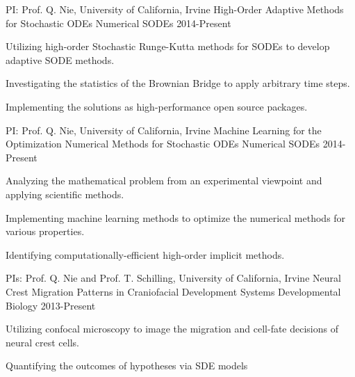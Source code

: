 

\begin{cventries}

\cventry
{PI: Prof. Q. Nie, University of California, Irvine} %
{High-Order Adaptive Methods for Stochastic ODEs} %
{Numerical SODEs} %
{2014-Present} %
{
	\begin{cvitems} %
		\item {Utilizing high-order Stochastic Runge-Kutta methods for SODEs to develop adaptive SODE methods.}
		\item {Investigating the statistics of the Brownian Bridge to apply arbitrary time steps.}
		\item {Implementing the solutions as high-performance open source packages.}
	\end{cvitems}
}
	
\cventry
{PI: Prof. Q. Nie, University of California, Irvine} %
{Machine Learning for the Optimization Numerical Methods for Stochastic ODEs} %
{Numerical SODEs} %
{2014-Present} %
{
	\begin{cvitems} %
		\item {Analyzing the mathematical problem from an experimental viewpoint and applying scientific methods.}
		\item {Implementing machine learning methods to optimize the numerical methods for various properties.}
		\item {Identifying computationally-efficient high-order implicit methods.}
	\end{cvitems}
}

\cventry
	{PIs: Prof. Q. Nie and Prof. T. Schilling, University of California, Irvine} %
	{Neural Crest Migration Patterns in Craniofacial Development} %
	{Systems Developmental Biology} %
	{2013-Present} %
	{
		\begin{cvitems} %
			\item {Utilizing confocal microscopy to image the migration and cell-fate decisions of neural crest cells.}
			\item {Quantifying the outcomes of hypotheses via SDE models}
		\end{cvitems}
	}
	

\end{cventries}
